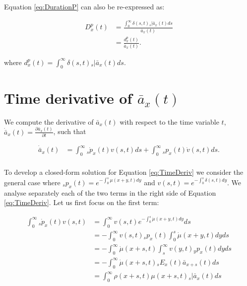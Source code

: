 \documentclass[12pt]{article}
\begin{document}
Equation \ref{eq:DurationP} can also be re-expressed as:

\begin{equation}\label{eq:DurationP2}
\begin{split}
{D}^{p}_{x}(t) &= \frac{\int_0^\infty \delta(s,t) {}_s|\bar{a}_x(t)ds} {\bar{a}_x(t)} \\
                 &= \frac{{d}^{p}_{x}(t)}{\bar{a}_x(t)}.
\end{split}
\end{equation}


where ${d}^{p}_{x}(t)=\int_0^\infty \delta(s,t) {}_s|\bar{a}_x(t) ds$. 




\section{Time derivative of $\bar{a}_x(t)$} \label{sec:timderiv}

We compute the derivative of $\bar{a}_x(t)$ with respect to the time variable $t$, $\dot{\bar{a}} _x(t)=\frac{\partial \bar{a}_x(t)}{\partial t}$, such that

\begin{equation}\label{eq:TimeDeriv}
\begin{split}
\dot{\bar{a}} _x(t) &= \int_0^\infty {}_s\dot{p}_x(t) v(s,t)ds +\int_0^\infty {}_sp_x(t) \dot{v}(s,t)ds.\\
\end{split}
\end{equation}


To develop a closed-form solution for Equation \ref{eq:TimeDeriv} we consider the general case where $_sp_x(t)=e^{-\int_{0}^{s}\mu(x+y,t)dy}$ and ${v}(s,t)=e^{-\int_{0}^{s}\delta(s,t)dy}$. We analyse separately each of the two terms in the right side of Equation \ref{eq:TimeDeriv}. Let us first focus on the first term:


\begin{equation}\label{eq:TimeDerivP1}
\begin{split}
\int_0^\infty {}_s\dot{p}_x(t) v(s,t) &= \int_0^\infty   v(s,t) e^{-\int_0^{s}\dot{\mu}(x+y,t)dy}ds\\
&= -\int_0^\infty   v(s,t) {}_sp_x(t)\int_0^{s}\dot{\mu}(x+y,t)dyds\\
&= -\int_0^\infty  \dot{\mu}(x+s,t) \int_s^{\infty} v(y,t) {}_yp_x(t) dyds\\
&= - \int_0^\infty \dot{\mu}(x+s,t)   {}_sE_x(t) \bar{a} _{x+s}(t) ds\\
&= \int_0^\infty \rho(x+s,t) \mu(x+s,t)   {}_s|\bar{a}_x(t) ds\\
\end{split}
\end{equation}
\end{document}
